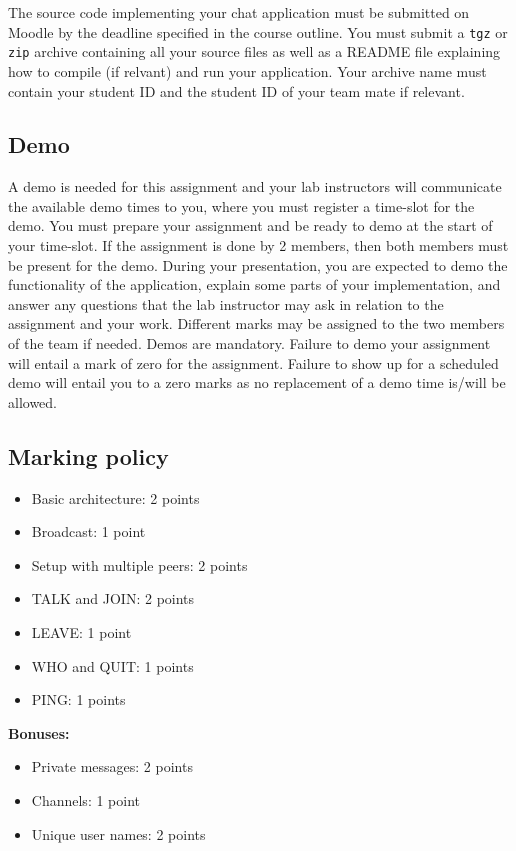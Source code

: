 \documentclass[11pt]{article}
\begin{document}
The source code implementing your chat application must be submitted
on Moodle by the deadline specified in the course outline. You must
submit a \texttt{tgz} or \texttt{zip} archive containing all your
source files as well as a README file explaining how to compile (if
relvant) and run your application. Your archive name must contain your student ID and the student ID of your team mate if relevant. 

\subsection{Demo}

A demo is needed for this assignment and your lab instructors will
communicate the available demo times to you, where you must register a
time-slot for the demo. You must prepare your assignment and be ready
to demo at the start of your time-slot. If the assignment is done by 2
members, then both members must be present for the demo.  During your
presentation, you are expected to demo the functionality of the
application, explain some parts of your implementation, and answer any
questions that the lab instructor may ask in relation to the
assignment and your work. Different marks may be assigned to the two
members of the team if needed. Demos are mandatory. Failure to demo
your assignment will entail a mark of zero for the assignment. Failure
to show up for a scheduled demo will entail you to a zero marks as no
replacement of a demo time is/will be allowed.

\subsection{Marking policy}

\begin{itemize}
\item Basic architecture: 2 points
\item Broadcast: 1 point
\item Setup with multiple peers: 2 points
\item TALK and JOIN: 2 points
\item LEAVE: 1 point
\item WHO and QUIT: 1 points
\item PING: 1 points
\end{itemize}

\textbf{Bonuses:}
\begin{itemize}
\item Private messages: 2 points
\item Channels: 1 point
\item Unique user names: 2 points
\end{itemize}
\end{document}
